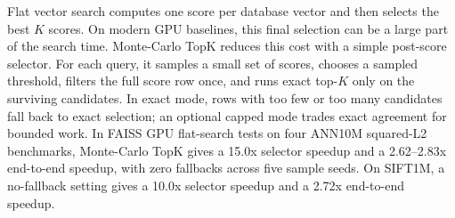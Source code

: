 Flat vector search computes one score per database vector and then selects the
best $K$ scores. On modern GPU baselines, this final selection can be a large
part of the search time. Monte-Carlo TopK reduces this cost with a simple
post-score selector. For each query, it samples a small set of scores, chooses a
sampled threshold, filters the full score row once, and runs exact top-$K$ only
on the surviving candidates. In exact mode, rows with too few or too many
candidates fall back to exact selection; an optional capped mode trades exact
agreement for bounded work. In FAISS GPU flat-search tests on four ANN10M squared-L2 benchmarks,
Monte-Carlo TopK gives a 15.0x selector speedup and a 2.62--2.83x end-to-end
speedup, with zero fallbacks across five sample seeds. On SIFT1M, a no-fallback
setting gives a 10.0x selector speedup and a 2.72x end-to-end speedup.
